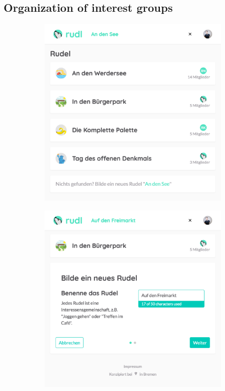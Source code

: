 \documentclass[12pt,numbers=noenddot,parskip,bibliography=totocnumbered,listof=totocnumbered,draft]{scrreprt}
\begin{document}
\subsection{Organization of interest groups}
\begin{figure}
\begin{subfigure}[t]{0.45\textwidth}%
\centering
\includegraphics[width=\linewidth]{searchinterestgroup.png}
\caption{}
\label{searchinterestgroup}
\end{subfigure}%
\hfill
\begin{subfigure}[t]{0.45\textwidth}%
\centering
\includegraphics[width=\linewidth]{createinterestgroup0.png}
\caption{}
\label{createinterestgroup0}
\end{subfigure}%


\end{figure}
\end{document}
